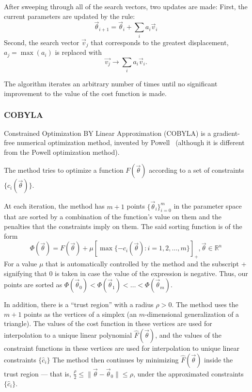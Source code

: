 \documentclass[a4paper,12pt]{article}
\newcommand{\thetas}{\vec{\theta}}
\begin{document}
After sweeping through all of the search vectors, two updates are made:
First, the current parameters are updated by the rule:
\begin{equation}
    \thetas_{i+1} = \thetas_{i} + \sum_i a_i \vec{v}_i
\end{equation}
Second, the search vector $\vec{v}_j$ that corresponds to the greatest displacement, $a_j = \max(a_i)$ is replaced with
\begin{equation}
    \vec{v_j} \to \sum_i a_i \vec{v}_i.
\end{equation}

The algorithm iterates an arbitrary number of times until no significant improvement to the value of the cost function is made.


\subsubsection{COBYLA}
Constrained Optimization BY Linear Approximation (COBYLA) is a gradient-free numerical optimization method, invented by Powell~\cite{Powell1994,powell_view_2007} (although it is different from the Powell optimization method).

The method tries to optimize a function $F(\thetas)$ according to a set of constraints $\{c_i(\thetas)\}$.

At each iteration, the method has $m+1$ points $\{\thetas_i\}_{i=0}^m$ in the parameter space that are sorted by a combination of the function's value on them and the penalties that the constraints imply on them.
The said sorting function is of the form
\begin{equation}
    \Phi(\thetas) = F(\thetas) + \mu[ \max\{-c_i(\thetas) : i=1,2,\dots,m \} ]_+, \thetas \in \mathbb{R}^n
\end{equation}
For a value $\mu$ that is automatically controlled by the method and the subscript + signifying that 0 is taken in case the value of the expression is negative.
Thus, our points are sorted as $\Phi(\thetas_0) < \Phi(\thetas_1) < \dots < \Phi(\thetas_m)$.

In addition, there is a ``trust region'' with a radius $\rho>0$. The method uses the $m+1$ points as the vertices of a simplex (an $m$-dimensional generalization of a triangle).
The values of the cost function in these vertices are used for interpolation to a unique linear polynomial $\hat{F}(\thetas)$, and the values of the constraint functions in these vertices are used for interpolation to unique linear constraints $\{\hat{c}_i\}$
The method then continues by minimizing $\hat{F}(\thetas)$ inside the trust region --- that is, $\frac{\rho}{2} \leq \|\thetas - \thetas_0\| \leq \rho$, under the approximated constraints $\{\hat{c}_i\}$.
\end{document}
